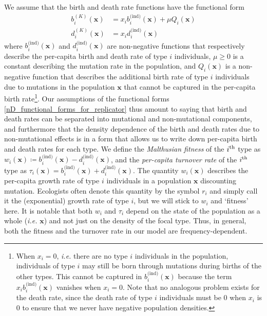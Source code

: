 We assume that the birth and death rate functions have the functional form
\begin{equation}
\label{nD_functional_forms_for_replicator}
\begin{aligned}
b^{(K)}_i(\mathbf{x}) &= x_ib^{\textrm{(ind)}}_{i}(\mathbf{x}) + \mu Q_i(\mathbf{x})\\
d^{(K)}_i(\mathbf{x}) &= x_id^{\textrm{(ind)}}_i(\mathbf{x})
\end{aligned}
\end{equation}
where $b^{\textrm{(ind)}}_{i}(\mathbf{x})$ and $d^{\textrm{(ind)}}_{i}(\mathbf{x})$ are non-negative functions that respectively describe the per-capita birth and death rate of type $i$ individuals, $\mu \geq 0$ is a constant describing the mutation rate in the population, and $Q_i(\mathbf{x})$ is a non-negative function that describes the additional birth rate of type $i$ individuals due to mutations in the population $\mathbf{x}$ that cannot be captured in the per-capita birth rate\footnote{When $x_i = 0$, \emph{i.e.} there are no type $i$ individuals in the population, individuals of type $i$ may still be born through mutations during births of the other types. This cannot be captured in $b^{\textrm{(ind)}}_{i}(\mathbf{x})$ because the term $x_ib^{\textrm{(ind)}}_{i}(\mathbf{x})$ vanishes when $x_i = 0$. Note that no analogous problem exists for the death rate, since the death rate of type $i$ individuals must be 0 when $x_i$ is 0 to ensure that we never have negative population densities.}. Our assumptions of the functional forms \eqref{nD_functional_forms_for_replicator} thus amount to saying that birth and death rates can be separated into mutational and non-mutational components, and furthermore that the density dependence of the birth and death rates due to non-mutational effects is in a form that allows us to write down per-capita birth and death rates for each type. We define the \emph{Malthusian fitness} of the $i\textsuperscript{th}$ type as $w_i(\mathbf{x}) \coloneqq b^{\textrm{(ind)}}_{i}(\mathbf{x}) - d^{\textrm{(ind)}}_{i}(\mathbf{x})$, and the \emph{per-capita turnover rate} of the $i\textsuperscript{th}$ type as $\tau_i(\mathbf{x}) = b^{\textrm{(ind)}}_{i}(\mathbf{x}) + d^{\textrm{(ind)}}_{i}(\mathbf{x})$.  The quantity $w_i(\mathbf{x})$ describes the per-capita growth rate of type $i$ individuals in a population $\mathbf{x}$ discounting mutation. Ecologists often denote this quantity by the symbol $r_i$ and simply call it the (exponential) growth rate of type $i$, but we will stick to $w_i$ and `fitness' here. It is notable that both $w_i$ and $\tau_i$ depend on the state of the population as a whole (\textit{i.e.} $\mathbf{x}$) and not just on the density of the focal type. Thus, in general, both the fitness and the turnover rate in our model are frequency-dependent.

